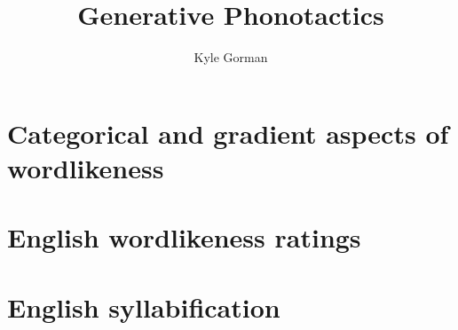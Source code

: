 \documentclass{upenndiss}
\title{Generative Phonotactics}
\author{Kyle Gorman}
\begin{document}

%
\chapter{Categorical and gradient aspects of wordlikeness}

%
%

\appendix 
\renewcommand{\arraystretch}{0.25}

\chapter{English wordlikeness ratings}


\chapter{English syllabification}


%

%



\end{document}
